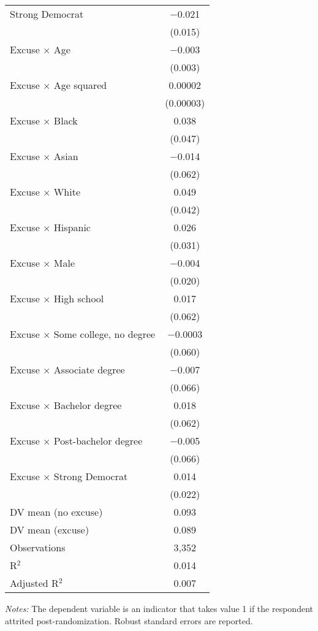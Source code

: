 \begin{center}
\begin{ThreePartTable}
\begin{longtable}{lc}
 \addlinespace 
 Strong Democrat & $-$0.021 \\ 
  & (0.015) \\ 
 \addlinespace 
 Excuse $\times$ Age & $-$0.003 \\ 
  & (0.003) \\ 
 \addlinespace 
 Excuse $\times$ Age squared & 0.00002 \\ 
  & (0.00003) \\ 
 \addlinespace 
 Excuse $\times$ Black & 0.038 \\ 
  & (0.047) \\ 
 \addlinespace 
 Excuse $\times$ Asian & $-$0.014 \\ 
  & (0.062) \\ 
 \addlinespace 
 Excuse $\times$ White & 0.049 \\ 
  & (0.042) \\ 
 \addlinespace 
 Excuse $\times$ Hispanic & 0.026 \\ 
  & (0.031) \\ 
 \addlinespace 
 Excuse $\times$ Male & $-$0.004 \\ 
  & (0.020) \\ 
 \addlinespace 
 Excuse $\times$ High school & 0.017 \\ 
  & (0.062) \\ 
 \addlinespace 
 Excuse $\times$ Some college, no degree & $-$0.0003 \\ 
  & (0.060) \\ 
 \addlinespace 
 Excuse $\times$ Associate degree & $-$0.007 \\ 
  & (0.066) \\ 
 \addlinespace 
 Excuse $\times$ Bachelor degree & 0.018 \\ 
  & (0.062) \\ 
 \addlinespace 
 Excuse $\times$ Post-bachelor degree & $-$0.005 \\ 
  & (0.066) \\ 
 \addlinespace 
 Excuse $\times$ Strong Democrat & 0.014 \\ 
  & (0.022) \\ 
 \addlinespace 
\midrule  
DV mean (no excuse) & 0.093 \\
DV mean (excuse) & 0.089 \\
Observations & 3,352 \\ 
R$^{2}$ & 0.014 \\ 
Adjusted R$^{2}$ & 0.007 \\ 
\bottomrule 
\end{longtable}
\end{ThreePartTable}
\end{center}
\footnotesize
\insertTableNotes
\textit{Notes: }The dependent variable is an indicator that takes value 1 if the respondent attrited post-randomization. Robust standard errors are reported.
